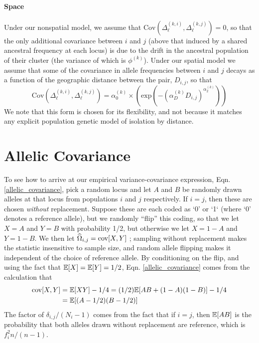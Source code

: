 \documentclass[12pt]{article}
\begin{document}
\paragraph{Space}
Under our nonspatial model, 
we assume that $\text{Cov}(\Delta^{(k,i)}_{\ell},\Delta^{(k,j)}_{\ell})=0$,
so that the only additional covariance between $i$ and $j$ 
(above that induced by a shared ancestral frequency at each locus)
is due to the drift in the ancestral population of their cluster 
(the variance of which is $\phi^{(k)}$). 
Under our spatial model we assume that some of the covariance in allele frequencies
between $i$ and $j$ decays as a function of the geographic distance
between the pair, $D_{i,j}$,
so that 
\begin{equation}
\text{Cov}(\Delta^{(k,i)}_{\ell},\Delta^{(k,j)}_{\ell}) = \alpha^{(k)}_0 \times \left(\text{exp} \left(  -(\alpha^{(k)}_D D_{i,j})^{\alpha^{(k)}_2}\right) \right)
\end{equation}
We note that this form is chosen for its flexibility, 
and not because it matches any explicit population genetic model of isolation by distance. 

\section{Allelic Covariance}\label{allelic_cov}
To see how to arrive at our empirical variance-covariance expression, Eqn. \eqref{allelic_covariance},
pick a random locus and
let $A$ and $B$ be randomly drawn alleles at that locus from populations $i$ and $j$ respectively.
If $i=j$, then these are chosen \emph{without} replacement.
Suppose these are each coded as `0' or `1` (where `0' denotes a reference allele),
but we randomly ``flip'' this coding, so that we let $X=A$ and $Y=B$ with probability 1/2,
but otherwise we let $X=1-A$ and $Y=1-B$.
We then let $\widehat{\Omega}_{i,j} = \mathop{\mbox{cov}}[X,Y]$ ; 
sampling without replacement makes the statistic insensitive to sample size,
and random allele flipping makes it independent of the choice of reference allele.
By conditioning on the flip,
and using the fact that $\mathbb{E}[X] = \mathbb{E}[Y] = 1/2$,
Eqn. \eqref{allelic_covariance} comes from the calculation that
\begin{align}
\mathop{\mbox{cov}}[X,Y] &= \mathbb{E}[XY] - 1/4 = (1/2)\mathbb{E}[AB + (1-A)(1-B)] - 1/4\\\notag
&= \mathbb{E}[(A-1/2)(B-1/2)]
\end{align}
The factor of $\delta_{i,j}/(N_i-1)$ comes from the fact that if $i=j$,
then $\mathbb{E}[AB]$ is the probability that both alleles drawn without replacement are reference,
which is $f_i^2 n/(n-1)$.
\end{document}

